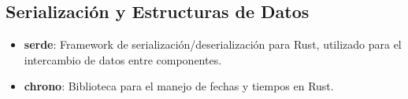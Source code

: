 \subsection{Serialización y Estructuras de Datos}
\begin{itemize}
    \item \textbf{serde}: Framework de serialización/deserialización para Rust, utilizado para el intercambio de datos entre componentes.
    \item \textbf{chrono}: Biblioteca para el manejo de fechas y tiempos en Rust.
\end{itemize}
